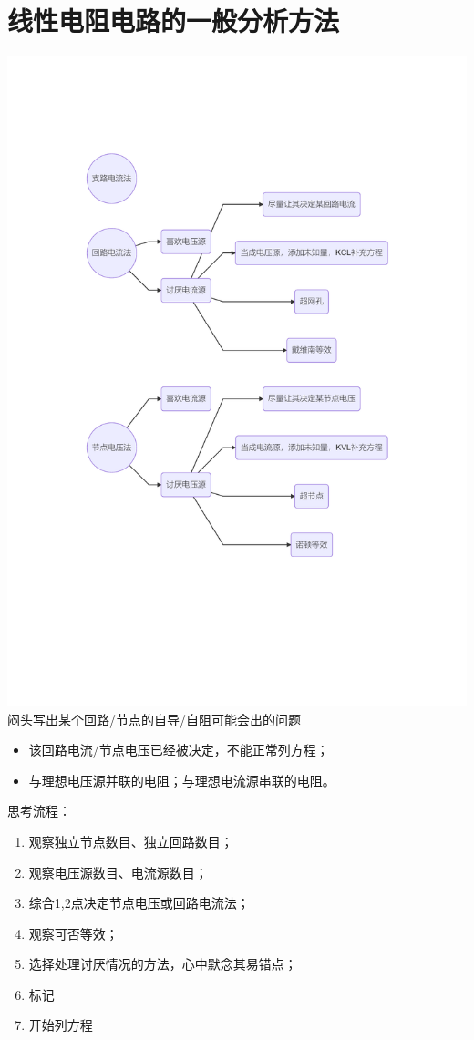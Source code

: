 \documentclass{tufte-book}
\begin{document}
\chapter{线性电阻电路的一般分析方法}
{
    \includegraphics[width=\textwidth]{线性电阻电路的一般分析方法.pdf}
}
闷头写出某个回路/节点的自导/自阻可能会出的问题
\begin{itemize}
    \item 该回路电流/节点电压已经被决定，不能正常列方程；
    \item 与理想电压源并联的电阻；与理想电流源串联的电阻。
\end{itemize}
思考流程：
\begin{enumerate}
    \item 观察独立节点数目、独立回路数目；
    \item 观察电压源数目、电流源数目；
    \item 综合1,2点决定节点电压或回路电流法；
    \item 观察可否等效；
    \item 选择处理讨厌情况的方法，心中默念其易错点；
    \item 标记
    \item 开始列方程
\end{enumerate}
\backmatter

\printindex
\end{document}
